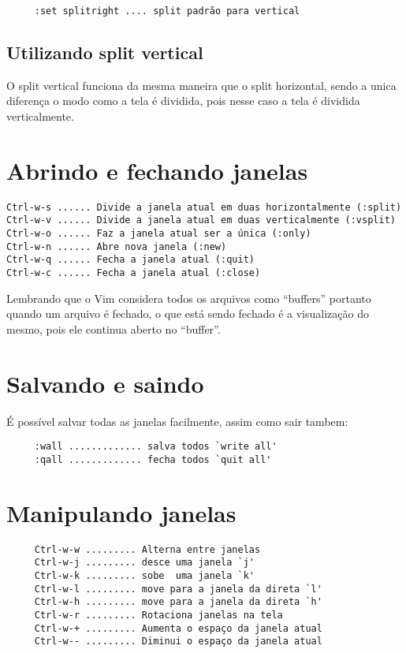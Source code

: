 \begin{verbatim}
     :set splitright .... split padrão para vertical
\end{verbatim}


\subsection{Utilizando split vertical}

O split vertical funciona da mesma maneira que o split horizontal,
sendo a unica diferença o modo como a tela é dividida, pois nesse
caso a tela é dividida verticalmente.


\section{Abrindo e fechando janelas }

\begin{verbatim}
Ctrl-w-s ...... Divide a janela atual em duas horizontalmente (:split)
Ctrl-w-v ...... Divide a janela atual em duas verticalmente (:vsplit)
Ctrl-w-o ...... Faz a janela atual ser a única (:only)
Ctrl-w-n ...... Abre nova janela (:new)
Ctrl-w-q ...... Fecha a janela atual (:quit)
Ctrl-w-c ...... Fecha a janela atual (:close)
\end{verbatim}

{\Large {}} Lembrando que o Vim considera todos os arquivos como ``buffers''
portanto quando um arquivo é fechado, o que está sendo fechado é a visualização
do mesmo, pois ele continua aberto no ``buffer''.


\section{Salvando e saindo}
É possível salvar todas as janelas facilmente, assim como sair tambem:

\begin{verbatim}
     :wall ............. salva todos `write all'
     :qall ............. fecha todos `quit all'
\end{verbatim}


\section{Manipulando janelas }

\begin{verbatim}
     Ctrl-w-w ......... Alterna entre janelas
     Ctrl-w-j ......... desce uma janela `j'
     Ctrl-w-k ......... sobe  uma janela `k'
     Ctrl-w-l ......... move para a janela da direta `l'
     Ctrl-w-h ......... move para a janela da direta `h'
     Ctrl-w-r ......... Rotaciona janelas na tela
     Ctrl-w-+ ......... Aumenta o espaço da janela atual
     Ctrl-w-- ......... Diminui o espaço da janela atual
\end{verbatim}

